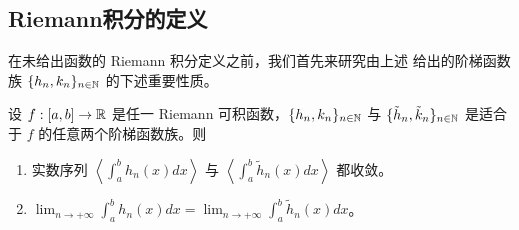 \subsection{Riemann积分的定义}

在未给出函数的 Riemann 积分定义之前，我们首先来研究由上述 给出的阶梯函数族 \(\{h_n,k_n\}_{n\in\mathbb{N}}\) 的下述重要性质。

\begin{mylemma*}{}

	设 \(f:[a,b]\to\mathbb{R}\) 是任一 Riemann 可积函数，\(\{h_n,k_n\}_{n\in\mathbb{N}}\) 与 \(\{\tilde h_n,\tilde k_n\}_{n\in\mathbb{N}}\) 是适合于 \(f\) 的任意两个阶梯函数族。则

	\begin{enumerate}[label=\arabic*)]
		\item 实数序列 \(\left\langle\int_a^b h_n(x)dx\right\rangle\) 与 \(\left\langle\int_a^b\tilde h_n(x)dx\right\rangle\) 都收敛。

		\item \(\displaystyle\lim_{n\to+\infty}\int_a^b h_n(x)dx=\lim_{n\to+\infty}\int_a^b\tilde h_n(x)dx\)。
	\end{enumerate}

\end{mylemma*}

